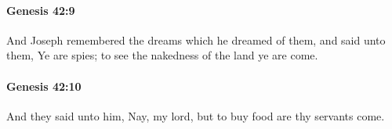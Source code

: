 		\paragraph{Genesis 42:9} %
			\label{GENESIS-42-9}

			And Joseph remembered the dreams which he dreamed of them, and said unto them, Ye are spies; to see the nakedness of the land ye are come.


		\paragraph{Genesis 42:10} %
			\label{GENESIS-42-10}

			And they said unto him, Nay, my lord, but to buy food are thy servants come.



